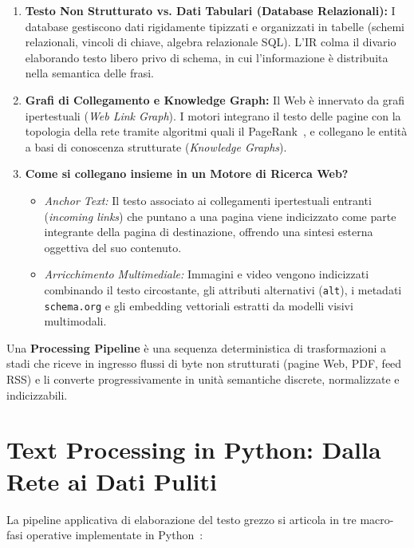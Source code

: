 \begin{enumerate}
    \item \textbf{Testo Non Strutturato vs. Dati Tabulari (Database Relazionali):} I database gestiscono dati rigidamente tipizzati e organizzati in tabelle (schemi relazionali, vincoli di chiave, algebra relazionale SQL). L'IR colma il divario elaborando testo libero privo di schema, in cui l'informazione \`e distribuita nella semantica delle frasi.
    \item \textbf{Grafi di Collegamento e Knowledge Graph:} Il Web \`e innervato da grafi ipertestuali (\textit{Web Link Graph}). I motori integrano il testo delle pagine con la topologia della rete tramite algoritmi quali il PageRank~\cite{manning2008}, e collegano le entità a basi di conoscenza strutturate (\textit{Knowledge Graphs}).
    \item \textbf{Come si collegano insieme in un Motore di Ricerca Web?}
    \begin{itemize}
        \item \textit{Anchor Text:} Il testo associato ai collegamenti ipertestuali entranti (\textit{incoming links}) che puntano a una pagina viene indicizzato come parte integrante della pagina di destinazione, offrendo una sintesi esterna oggettiva del suo contenuto.
        \item \textit{Arricchimento Multimediale:} Immagini e video vengono indicizzati combinando il testo circostante, gli attributi alternativi (\texttt{alt}), i metadati \texttt{schema.org} e gli embedding vettoriali estratti da modelli visivi multimodali.
    \end{itemize}
\end{enumerate}

\begin{definition}
Una \textbf{Processing Pipeline} \`e una sequenza deterministica di trasformazioni a stadi che riceve in ingresso flussi di byte non strutturati (pagine Web, PDF, feed RSS) e li converte progressivamente in unit\`a semantiche discrete, normalizzate e indicizzabili.
\end{definition}

\FloatBarrier
\section{Text Processing in Python: Dalla Rete ai Dati Puliti}
\label{sec:text-processing-python}

La pipeline applicativa di elaborazione del testo grezzo si articola in tre macro-fasi operative implementate in Python~\cite{bird2009}:

